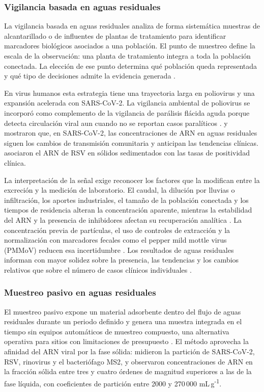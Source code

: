 \subsubsection{Vigilancia basada en aguas residuales}

La vigilancia basada en aguas residuales analiza de forma sistemática muestras de alcantarillado o de influentes de plantas de tratamiento para identificar marcadores biológicos asociados a una población. El punto de muestreo define la escala de la observación: una planta de tratamiento integra a toda la población conectada. La elección de ese punto determina qué población queda representada y qué tipo de decisiones admite la evidencia generada \cite{Parkins_2023}.

En virus humanos esta estrategia tiene una trayectoria larga en poliovirus y una expansión acelerada con SARS-CoV-2. La vigilancia ambiental de poliovirus se incorporó como complemento de la vigilancia de parálisis flácida aguda porque detecta circulación viral aun cuando no se reportan casos paralíticos \cite{Asghar_2014}.  y  mostraron que, en SARS-CoV-2, las concentraciones de ARN en aguas residuales siguen los cambios de transmisión comunitaria y anticipan las tendencias clínicas.  asociaron el ARN de RSV en sólidos sedimentados con las tasas de positividad clínica.

La interpretación de la señal exige reconocer los factores que la modifican entre la excreción y la medición de laboratorio. El caudal, la dilución por lluvias o infiltración, los aportes industriales, el tamaño de la población conectada y los tiempos de residencia alteran la concentración aparente, mientras la estabilidad del ARN y la presencia de inhibidores afectan su recuperación analítica \cite{Parkins_2023}. La concentración previa de partículas, el uso de controles de extracción y la normalización con marcadores fecales como el pepper mild mottle virus (PMMoV) reducen esa incertidumbre \cite{Hughes_2022}. Los resultados de aguas residuales informan con mayor solidez sobre la presencia, las tendencias y los cambios relativos que sobre el número de casos clínicos individuales \cite{Parkins_2023}.

\subsubsection{Muestreo pasivo en aguas residuales}

El muestreo pasivo expone un material adsorbente dentro del flujo de aguas residuales durante un periodo definido y genera una muestra integrada en el tiempo sin equipos automáticos de muestreo compuesto, una alternativa operativa para sitios con limitaciones de presupuesto \cite{Parkins_2023}. El método aprovecha la afinidad del ARN viral por la fase sólida:  midieron la partición de SARS-CoV-2, RSV, rinovirus y el bacteriófago MS2, y observaron concentraciones de ARN en la fracción sólida entre tres y cuatro órdenes de magnitud superiores a las de la fase líquida, con coeficientes de partición entre 2000 y 270\,000 mL\,g\textsuperscript{-1}.

